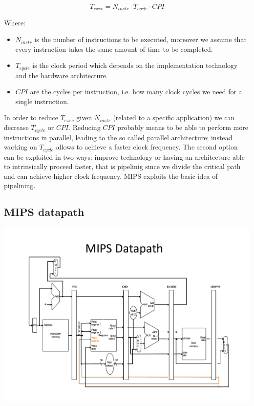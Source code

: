 \begin{equation*}
T_{exec}= N_{instr} \cdot T_{cycle} \cdot CPI
\end{equation*}

Where:
\begin{itemize}
  \item $N_{instr}$ is the number of instructions to be executed, moreover we
    assume that every instruction takes the same amount of time to be completed.
  \item $T_{cycle}$ is the clock period which depends on the implementation
    technology and the hardware architecture.
  \item $CPI$ are the cycles per instruction, i.e. how many clock cycles we
    need for a single instruction.

\end{itemize}

In order to reduce $T_{exec}$ given $N_{instr}$ (related to a specific
application) we can decrease $T_{cycle}$ or $CPI$. Reducing $CPI$ probably means
to be able to perform more instructions in parallel, leading to the so called
parallel architecture; instead working on $T_{cycle}$ allows to achieve a faster
clock frequency. The second option can be exploited in two ways: improve
technology or having an architecture able to intrinsically proceed faster, that
is pipelinig since we divide the critical path and can achieve higher clock
frequency. MIPS exploits the basic idea of pipelining.


\subsection{MIPS datapath}
\begin{center}
  \includegraphics[width=1.0\linewidth]{img/img3/mips1}
\end{center}

